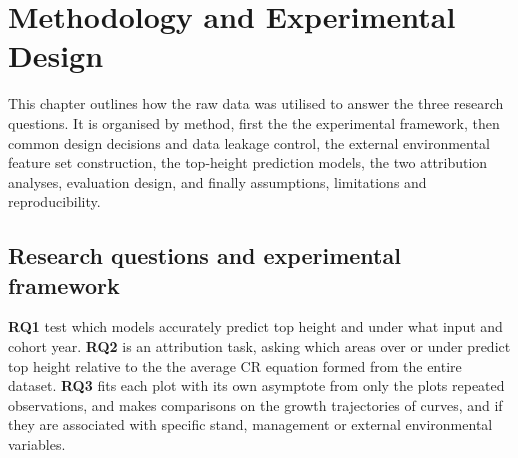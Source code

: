 \documentclass[11pt,a4paper]{report}
\begin{document}
\newcommand{\fc}[1]{\textcolor{red}{[FactC: #1]}} 
\newcommand{\ct}[1]{\textcolor{orange}{[CITE: #1]}} 
\newcommand{\app}[1]{\textcolor{blue}{[APP: #1]}} 
\newcommand{\sr}[1]{\textcolor{teal}{[Sreword: #1]}}
\newcommand{\fig}[1]{\textcolor{purple}{[FIG: #1]}}

\chapter{Methodology and Experimental Design}
\label{ch:methodology}

This chapter outlines how the raw data was utilised to answer the three research questions. It is organised by method, first the the experimental framework, then common design decisions and data leakage control, the external environmental feature set construction, the top-height prediction models, the two attribution analyses, evaluation design, and finally assumptions, limitations and reproducibility. 

\section{Research questions and experimental framework}
\textbf{RQ1} test which models accurately predict top height and under what input and cohort year. \textbf{RQ2} is an attribution task, asking which areas over or under predict top height relative to the the average CR equation formed from the entire dataset. \textbf{RQ3} fits each plot with its own asymptote from only the plots repeated observations, and makes comparisons on the growth trajectories of curves, and if they are associated with specific stand, management or external environmental variables. 
\end{document}
